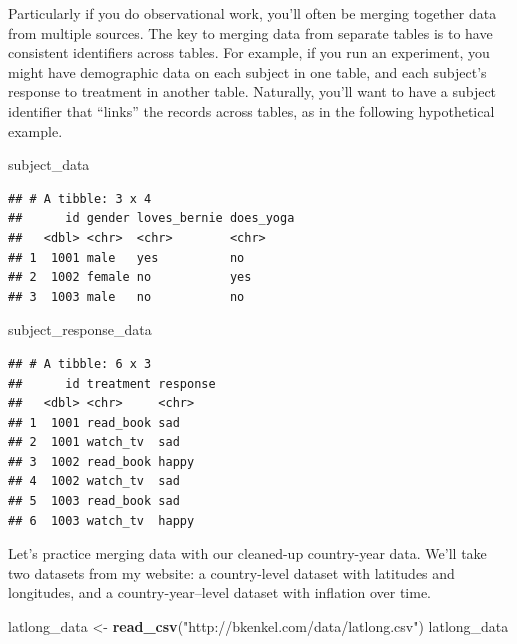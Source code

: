\documentclass[
  12pt,
  oneside,openany]{book}
\newenvironment{Shaded}{\begin{snugshade}}{\end{snugshade}}
\newcommand{\KeywordTok}[1]{\textcolor[rgb]{0.13,0.29,0.53}{\textbf{#1}}}
\newcommand{\NormalTok}[1]{#1}
\newcommand{\StringTok}[1]{\textcolor[rgb]{0.31,0.60,0.02}{#1}}
\begin{document}
Particularly if you do observational work, you'll often be merging together data from multiple sources.
The key to merging data from separate tables is to have consistent identifiers across tables. For example, if you run an experiment, you might have demographic data on each subject in one table, and each subject's response to treatment in another table. Naturally, you'll want to have a subject identifier that ``links'' the records across tables, as in the following hypothetical example.

\begin{Shaded}
\begin{Highlighting}[]
\NormalTok{subject\_data}
\end{Highlighting}
\end{Shaded}

\begin{verbatim}
## # A tibble: 3 x 4
##      id gender loves_bernie does_yoga
##   <dbl> <chr>  <chr>        <chr>    
## 1  1001 male   yes          no       
## 2  1002 female no           yes      
## 3  1003 male   no           no
\end{verbatim}

\begin{Shaded}
\begin{Highlighting}[]
\NormalTok{subject\_response\_data}
\end{Highlighting}
\end{Shaded}

\begin{verbatim}
## # A tibble: 6 x 3
##      id treatment response
##   <dbl> <chr>     <chr>   
## 1  1001 read_book sad     
## 2  1001 watch_tv  sad     
## 3  1002 read_book happy   
## 4  1002 watch_tv  sad     
## 5  1003 read_book sad     
## 6  1003 watch_tv  happy
\end{verbatim}

Let's practice merging data with our cleaned-up country-year data. We'll take two datasets from my website: a country-level dataset with latitudes and longitudes, and a country-year--level dataset with inflation over time.

\begin{Shaded}
\begin{Highlighting}[]
\NormalTok{latlong\_data <{-}}\StringTok{ }\KeywordTok{read\_csv}\NormalTok{(}\StringTok{"http://bkenkel.com/data/latlong.csv"}\NormalTok{)}
\NormalTok{latlong\_data}
\end{Highlighting}
\end{Shaded}
\end{document}
